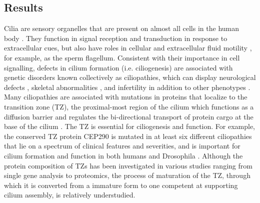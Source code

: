 \documentclass[12pt, twoside, letterpaper]{article}
\begin{document}
\begin{doublespacing}
\begin{linenumbers}
    \section{Results}
    Cilia are sensory organelles that are present on almost all cells in the human body
    \citep{satir2010primary, marshall2006cilia}.
    They function in signal reception and transduction in response to extracellular cues,
    but also have roles in cellular and extracellular fluid motility
    \citep{brooks2014multiciliated, marshall2006cilia},
    for example, as the sperm flagellum.
    Consistent with their importance in cell signalling,
    defects in cilium formation (i.e. ciliogenesis) are associated with genetic disorders
    known collectively as ciliopathies, which can display
    neurological defects \citep{valente2014primary},
    skeletal abnormalities \citep{hammarsjo2017novel},
    and infertility \citep{inaba2016sperm} in addition to other phenotypes
    \citep{waters2011ciliopathies}.
    Many ciliopathies are associated with mutations in proteins that localize
    to the transition zone (TZ), the proximal-most region of the cilium which
    functions as a diffusion barrier and regulates the
    bi-directional transport of protein cargo at the base of the cilium
    \citep{reiter2012base, szymanska2012transition}.
    The TZ is essential for ciliogenesis and function.
    For example, the conserved TZ protein CEP290 is mutated in at least
    six different ciliopathies that lie on a spectrum of clinical features and severities,
    and is important for cilium formation
    and function in both humans \citep{shimada2017vitro, stowe2012centriolar}
    and Drosophila \citep{basiri2014migrating}.
    Although the protein composition of TZs has been investigated in various
    studies ranging from single gene analysis to proteomics,
    the process of maturation of the TZ, through which it is converted from a
    immature form to one competent at supporting
    cilium assembly, is relatively understudied.


\end{linenumbers}
\end{doublespacing}
\end{document}
